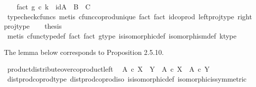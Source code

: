 \begin{isabellebody}
\ \ \isamarkupfalse%
\ fact{}{\isacharcolon}{\kern0pt}\ {\isachardoublequoteopen}{\isacharparenleft}{\kern0pt}g\ {\isasymcirc}\isactrlsub c\ k{\isacharparenright}{\kern0pt}\ {\isacharequal}{\kern0pt}\ id{\isacharparenleft}{\kern0pt}{\isacharparenleft}{\kern0pt}A\ {\isasymCoprod}\ B{\isacharparenright}{\kern0pt}\ {\isasymCoprod}\ C{\isacharparenright}{\kern0pt}{\isachardoublequoteclose}\isanewline
\ \ \ \ \isamarkupfalse%
\ {\isacharparenleft}{\kern0pt}typecheck{\isacharunderscore}{\kern0pt}cfuncs{\isacharcomma}{\kern0pt}\ metis\ cfunc{\isacharunderscore}{\kern0pt}coprod{\isacharunderscore}{\kern0pt}unique\ fact{}\ fact{}\ id{\isacharunderscore}{\kern0pt}coprod\ left{\isacharunderscore}{\kern0pt}proj{\isacharunderscore}{\kern0pt}type\ right{\isacharunderscore}{\kern0pt}proj{\isacharunderscore}{\kern0pt}type{\isacharparenright}{\kern0pt}\isanewline
\ \ \isamarkupfalse%
\ {\isacharquery}{\kern0pt}thesis\isanewline
\ \ \ \ \isamarkupfalse%
\ {\isacharparenleft}{\kern0pt}metis\ cfunc{\isacharunderscore}{\kern0pt}type{\isacharunderscore}{\kern0pt}def\ fact{}\ fact{}\ g{\isacharunderscore}{\kern0pt}type\ is{\isacharunderscore}{\kern0pt}isomorphic{\isacharunderscore}{\kern0pt}def\ isomorphism{\isacharunderscore}{\kern0pt}def\ k{\isacharunderscore}{\kern0pt}type{\isacharparenright}{\kern0pt}\isanewline
{}\isamarkupfalse%
%
\endisatagproof
{\isafoldproof}%
%
\isadelimproof
%
\endisadelimproof
%
\begin{isamarkuptext}%
The lemma below corresponds to Proposition 2.5.10.%
\end{isamarkuptext}\isamarkuptrue%
\isamarkupfalse%
\ product{\isacharunderscore}{\kern0pt}distribute{\isacharunderscore}{\kern0pt}over{\isacharunderscore}{\kern0pt}coproduct{\isacharunderscore}{\kern0pt}left{\isacharcolon}{\kern0pt}\isanewline
\ \ {\isachardoublequoteopen}A\ {\isasymtimes}\isactrlsub c\ {\isacharparenleft}{\kern0pt}X\ {\isasymCoprod}\ Y{\isacharparenright}{\kern0pt}\ {\isasymcong}\ {\isacharparenleft}{\kern0pt}A\ {\isasymtimes}\isactrlsub c\ X{\isacharparenright}{\kern0pt}\ {\isasymCoprod}\ {\isacharparenleft}{\kern0pt}A\ {\isasymtimes}\isactrlsub c\ Y{\isacharparenright}{\kern0pt}{\isachardoublequoteclose}\isanewline
%
\isadelimproof
\ \ %
\endisadelimproof
%
\isatagproof
{}\isamarkupfalse%
\ dist{\isacharunderscore}{\kern0pt}prod{\isacharunderscore}{\kern0pt}coprod{\isacharunderscore}{\kern0pt}type\ dist{\isacharunderscore}{\kern0pt}prod{\isacharunderscore}{\kern0pt}coprod{\isacharunderscore}{\kern0pt}iso\ is{\isacharunderscore}{\kern0pt}isomorphic{\isacharunderscore}{\kern0pt}def\ isomorphic{\isacharunderscore}{\kern0pt}is{\isacharunderscore}{\kern0pt}symmetric\ \isamarkupfalse%

\end{isabellebody}
